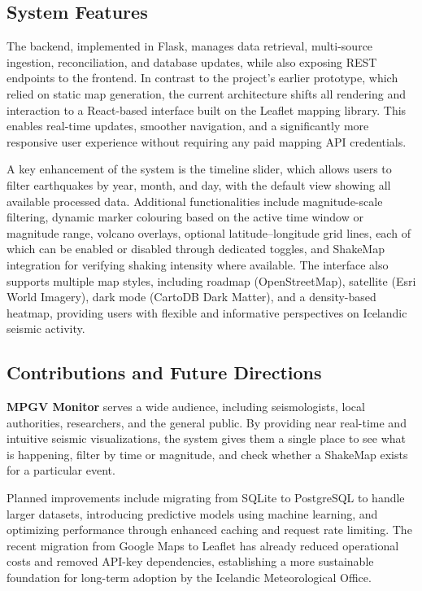 \documentclass[12pt]{article}
\begin{document}
\subsection*{System Features}
The backend, implemented in Flask, manages data retrieval, multi-source ingestion, reconciliation, and database updates, while also exposing REST endpoints to the frontend. In contrast to the project’s earlier prototype, which relied on static map generation, the current architecture shifts all rendering and interaction to a React-based interface built on the Leaflet mapping library. This enables real-time updates, smoother navigation, and a significantly more responsive user experience without requiring any paid mapping API credentials.

A key enhancement of the system is the timeline slider, which allows users to filter earthquakes by year, month, and day, with the default view showing all available processed data. Additional functionalities include magnitude-scale filtering, dynamic marker colouring based on the active time window or magnitude range, volcano overlays, optional latitude–longitude grid lines, each of which can be enabled or disabled through dedicated toggles, and ShakeMap integration for verifying shaking intensity where available. The interface also supports multiple map styles, including roadmap (OpenStreetMap), satellite (Esri World Imagery), dark mode (CartoDB Dark Matter), and a density-based heatmap, providing users with flexible and informative perspectives on Icelandic seismic activity.

\subsection*{Contributions and Future Directions}
\textbf{MPGV Monitor} serves a wide audience, including seismologists, local authorities, researchers, and the general public. By providing near real-time and intuitive seismic visualizations, the system gives them a single place to see what is happening, filter by time or magnitude, and check whether a ShakeMap exists for a particular event.

Planned improvements include migrating from SQLite to PostgreSQL to handle larger datasets, introducing predictive models using machine learning, and optimizing performance through enhanced caching and request rate limiting. The recent migration from Google Maps to Leaflet has already reduced operational costs and removed API-key dependencies, establishing a more sustainable foundation for long-term adoption by the Icelandic Meteorological Office.
\end{document}
